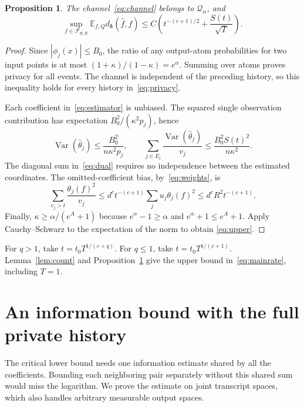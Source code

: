 \documentclass[11pt]{article}
\newtheorem{proposition}[theorem]{Proposition}
\newcommand{\E}{\mathbb E}
\begin{document}
\begin{proposition}\label{prop:upper}
The channel~\eqref{eq:channel} belongs to $\mathcal Q_\alpha$, and
\begin{equation}\label{eq:upper}
 \sup_{f\in\mathcal F_{\boldsymbol\beta,R}}
 \E_{f,Q}d_{\boldsymbol\delta}(\widehat f,f)
 \le C\left(t^{-(c+1)/2}+\frac{S(t)}{\sqrt T}\right).
\end{equation}
\end{proposition}
\begin{proof}
Since $|\phi_j(x)|\le B_0$, the ratio of any output-atom probabilities for
two input points is at most
$(1+\kappa)/(1-\kappa)=e^\alpha$. Summing over atoms proves privacy for
all events. The channel is independent of the preceding history, so this
inequality holds for every history in~\eqref{eq:privacy}.

Each coefficient in~\eqref{eq:estimator} is unbiased. The squared single
observation contribution has expectation $B_0^2/(\kappa^2p_j)$, hence
\[
 \operatorname{Var}(\widehat\theta_j)\le\frac{B_0^2}{n\kappa^2p_j},
 \qquad
 \sum_{j\in E_t}\frac{\operatorname{Var}(\widehat\theta_j)}{v_j}
 \le\frac{B_0^2 S(t)^2}{n\kappa^2}.
\]
The diagonal sum in~\eqref{eq:dual} requires no independence between the
estimated coordinates. The omitted-coefficient bias, by~\eqref{eq:weights}, is
\[
 \sum_{v_j>t}\frac{\theta_j(f)^2}{v_j}
 \le d^c t^{-(c+1)}\sum_j u_j\theta_j(f)^2
 \le d^c R^2t^{-(c+1)}.
\]
Finally, $\kappa\ge\alpha/(e^A+1)$ because
$e^\alpha-1\ge\alpha$ and $e^\alpha+1\le e^A+1$.
Apply Cauchy--Schwarz to the expectation of the norm to obtain
\eqref{eq:upper}.
\end{proof}

For $q>1$, take $t=t_0T^{1/(c+q)}$. For $q\le1$, take
$t=t_0T^{1/(c+1)}$. Lemma~\ref{lem:count} and
Proposition~\ref{prop:upper} give the upper bound in~\eqref{eq:mainrate},
including $T=1$.

\section{An information bound with the full private history}

The critical lower bound needs one information estimate shared by all the
coefficients. Bounding each neighboring pair separately without this shared
sum would miss the logarithm. We prove the estimate on joint transcript
spaces, which also handles arbitrary measurable output spaces.
\end{document}
